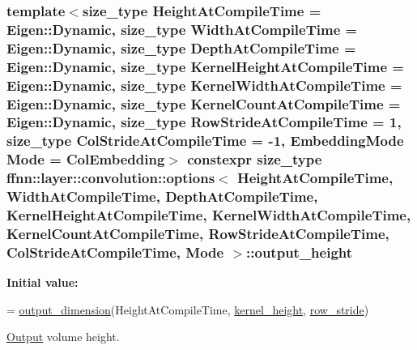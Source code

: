\hypertarget{structffnn_1_1layer_1_1convolution_1_1options_a87fc0d1d3147a21912001842783a0d54}{
\subsubsection[{output\-\_\-height}]{\setlength{\rightskip}{0pt plus 5cm}template$<$size\-\_\-type Height\-At\-Compile\-Time = Eigen\-::\-Dynamic, size\-\_\-type Width\-At\-Compile\-Time = Eigen\-::\-Dynamic, size\-\_\-type Depth\-At\-Compile\-Time = Eigen\-::\-Dynamic, size\-\_\-type Kernel\-Height\-At\-Compile\-Time = Eigen\-::\-Dynamic, size\-\_\-type Kernel\-Width\-At\-Compile\-Time = Eigen\-::\-Dynamic, size\-\_\-type Kernel\-Count\-At\-Compile\-Time = Eigen\-::\-Dynamic, size\-\_\-type Row\-Stride\-At\-Compile\-Time = 1, size\-\_\-type Col\-Stride\-At\-Compile\-Time = -\/1, Embedding\-Mode Mode = Col\-Embedding$>$ constexpr {\bf size\-\_\-type} {\bf ffnn\-::layer\-::convolution\-::options}$<$ Height\-At\-Compile\-Time, Width\-At\-Compile\-Time, Depth\-At\-Compile\-Time, Kernel\-Height\-At\-Compile\-Time, Kernel\-Width\-At\-Compile\-Time, Kernel\-Count\-At\-Compile\-Time, Row\-Stride\-At\-Compile\-Time, Col\-Stride\-At\-Compile\-Time, Mode $>$\-::output\-\_\-height\hspace{0.3cm}{\ttfamily [static]}}}\label{structffnn_1_1layer_1_1convolution_1_1options_a87fc0d1d3147a21912001842783a0d54}
{\bfseries Initial value\-:}
\begin{DoxyCode}
=
    \hyperlink{namespaceffnn_1_1layer_1_1convolution_aca263840b789df041d868a8a87dbf36a}{output\_dimension}(HeightAtCompileTime, \hyperlink{structffnn_1_1layer_1_1convolution_1_1options_a36fbdfa26d8032268955f68e66f09662}{kernel\_height}, 
      \hyperlink{structffnn_1_1layer_1_1convolution_1_1options_af557eea786920cd6341ca8a0498d3791}{row\_stride})
\end{DoxyCode}


\hyperlink{classffnn_1_1layer_1_1_output}{Output} volume height. 

